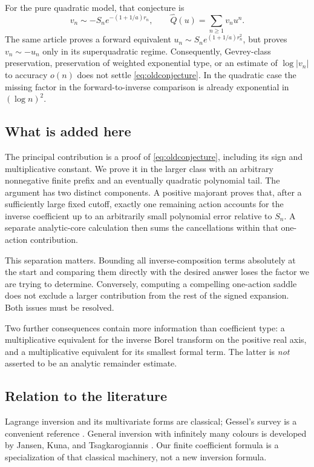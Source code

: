 \documentclass[11pt,a4paper]{article}
\numberwithin{equation}{section}
\theoremstyle{definition}\newtheorem{definition}[theorem]{Definition}
\theoremstyle{remark}\newtheorem{remark}[theorem]{Remark}
\theoremstyle{definition}
\newcommand{\Q}{\widehat Q}
\begin{document}
For the pure quadratic model, that conjecture is
\begin{equation}
 v_n\sim-S_n e^{-(1+1/a)r_n},
 \qquad \Q(u)=\sum_{n\ge1}v_nu^n.
 \label{eq:oldconjecture}
\end{equation}
The same article proves a forward equivalent
\(u_n\sim S_ne^{(1+1/a)r_n^2}\), but proves
\(v_n\sim-u_n\) only in its superquadratic regime. Consequently,
Gevrey-class preservation, preservation of weighted exponential type, or
an estimate of \(\log|v_n|\) to accuracy \(o(n)\) does not settle
\eqref{eq:oldconjecture}. In the quadratic case the missing factor in the
forward-to-inverse comparison is already exponential in \((\log n)^2\).

\subsection{What is added here}
The principal contribution is a proof of \eqref{eq:oldconjecture}, including
its sign and multiplicative constant. We prove it in the larger class with
an arbitrary nonnegative finite prefix and an eventually quadratic polynomial
tail. The argument has two distinct components. A positive majorant proves
that, after a sufficiently large fixed cutoff, exactly one remaining action
accounts for the inverse coefficient up to an arbitrarily small polynomial
error relative to \(S_n\). A separate analytic-core calculation then sums
the cancellations within that one-action contribution.

This separation matters. Bounding all inverse-composition terms absolutely
at the start and comparing them directly with the desired answer loses the
factor we are trying to determine. Conversely, computing a compelling
one-action saddle does not exclude a larger contribution from the rest of
the signed expansion. Both issues must be resolved.

Two further consequences contain more information than coefficient type:
a multiplicative equivalent for the inverse Borel transform on the positive
real axis, and a multiplicative equivalent for its smallest formal term.
The latter is \emph{not} asserted to be an analytic remainder estimate.

\subsection{Relation to the literature}
Lagrange inversion and its multivariate forms are classical; Gessel's survey
is a convenient reference \cite{gessel}. General inversion with infinitely
many colours is developed by Jansen, Kuna, and Tsagkarogiannis \cite{jkt}.
Our finite coefficient formula is a specialization of that classical
machinery, not a new inversion formula.
\end{document}
